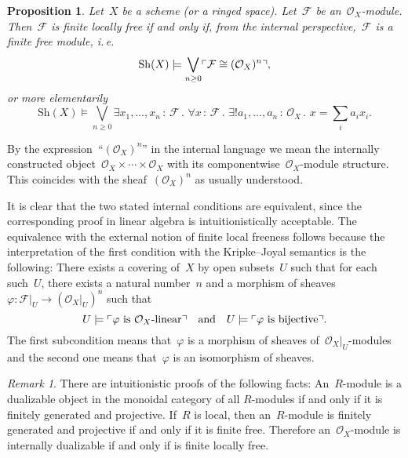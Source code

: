 \documentclass[10pt,reqno,a4paper]{amsbook}
\makeatletter
\theoremstyle{definition}
\theoremstyle{plain}
\newtheorem{prop}[defn]{Proposition}
\theoremstyle{remark}
\newtheorem{rem}[defn]{Remark}
\newcommand{\F}{\mathcal{F}}
\renewcommand{\O}{\mathcal{O}}
\newcommand{\Sh}{\mathrm{Sh}}
\newcommand{\?}{\,{:}\,}
\renewcommand{\_}{\mathpunct{.}\,}
\newcommand{\speak}[1]{\ulcorner\text{\textnormal{#1}}\urcorner}
\newcommand{\ie}{i.\,e.\@\xspace}
\renewenvironment{proof}[1][\proofname]{\par
  \pushQED{\qed}%
  \normalfont \topsep6\p@\@plus6\p@\relax
  \trivlist
  \item[\hskip\labelsep
        \itshape
    #1\@addpunct{.}]\ignorespaces
}{%
  \popQED\endtrivlist\@endpefalse
}
\makeatother
\begin{document}
\begin{prop}\label{prop:locally-free}
Let~$X$ be a scheme (or a ringed space). Let~$\F$ be
an~$\O_X$-module. Then~$\F$ is finite locally free if and only if, from the
internal perspective,~$\F$ is a finite free module, \ie
\[ \Sh(X) \models \bigvee_{n \geq 0} \speak{$\F \cong (\O_X)^n$}, \]
or more elementarily
\[ \Sh(X) \models \bigvee_{n \geq 0}
  \exists x_1,\ldots,x_n\?\F\_
  \forall x\?\F\_
  \exists! a_1,\ldots,a_n\?\O_X\_
  x = \textstyle\sum\limits_i a_i x_i. \]
\end{prop}
\begin{proof}By the expression~``$(\O_X)^n$'' in the internal language we mean
the internally constructed object~$\O_X \times \cdots \times \O_X$ with its
componentwise~$\O_X$-module structure. This coincides with the sheaf~$(\O_X)^n$ as
usually understood.

It is clear that the two stated internal conditions are equivalent, since the
corresponding proof in linear algebra is intuitionistically acceptable. The equivalence with
the external notion of finite local freeness follows because the
interpretation of the first condition with the Kripke--Joyal semantics is the
following: There exists a covering of~$X$ by open subsets~$U$ such that for
each such~$U$, there exists a natural number~$n$ and a morphism of
sheaves~$\varphi : \F|_U \to (\O_X|_U)^n$ such that
\[ U \models \speak{$\varphi$ is~$\O_X$-linear} \quad\text{and}\quad
  U \models \speak{$\varphi$ is bijective}. \]
The first subcondition means that~$\varphi$ is a morphism of sheaves
of~$\O_X|_U$-modules and the second one means that~$\varphi$ is an isomorphism of
sheaves.
\end{proof}

\begin{rem}There are intuitionistic proofs of the following facts:
An~$R$-module is a dualizable object in the monoidal category of all
$R$-modules if and only if it is finitely generated and projective. If~$R$ is
local, then an~$R$-module is finitely generated and projective if and only if
it is finite free. Therefore an~$\O_X$-module is internally dualizable if and
only if is finite locally free.
\end{rem}
\end{document}
